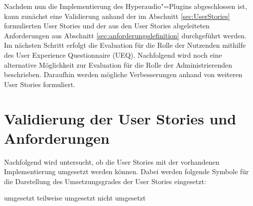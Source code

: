 \label{cap:evaluation}
Nachdem nun die Implementierung des Hyperaudio"=Plugins abgeschlossen ist, kann zunächst eine Validierung anhand der im Abschnitt \ref{sec:UserStories} formulierten User Stories und der aus den User Stories abgeleiteten Anforderungen aus Abschnitt \ref{sec:anforderungsdefinition} durchgeführt werden. Im nächsten Schritt erfolgt die Evaluation für die Rolle der Nutzenden mithilfe des User Experience Questionnaire (UEQ). Nachfolgend wird noch eine alternative Möglichkeit zur Evaluation für die Rolle der Administrierenden beschrieben. Daraufhin werden mögliche Verbesserungen anhand von weiteren User Stories formuliert.



\section{Validierung der User Stories und Anforderungen}
Nachfolgend wird untersucht, ob die User Stories mit der vorhandenen Implementierung umgesetzt werden können. Dabei werden folgende Symbole für die Darstellung des Umsetzungsgrades der User Stories eingesetzt:

\begin{center}
\Checkmark  \nobreakspace\nobreakspace umgesetzt \qquad \Asterisk \nobreakspace\nobreakspace teilweise umgesetzt \qquad \XSolidBrush \nobreakspace\nobreakspace nicht umgesetzt\\
\end{center}

